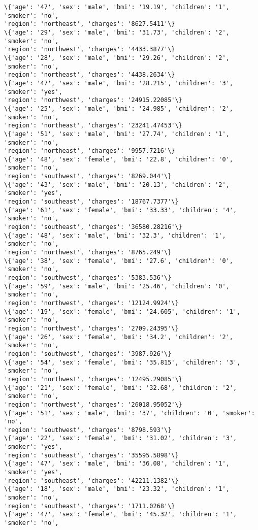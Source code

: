 \documentclass[11pt]{article}
\begin{document}
\begin{Verbatim}[commandchars=\\\{\}]
\{'age': '47', 'sex': 'male', 'bmi': '19.19', 'children': '1', 'smoker': 'no',
'region': 'northeast', 'charges': '8627.5411'\}
\{'age': '29', 'sex': 'male', 'bmi': '31.73', 'children': '2', 'smoker': 'no',
'region': 'northwest', 'charges': '4433.3877'\}
\{'age': '28', 'sex': 'male', 'bmi': '29.26', 'children': '2', 'smoker': 'no',
'region': 'northeast', 'charges': '4438.2634'\}
\{'age': '47', 'sex': 'male', 'bmi': '28.215', 'children': '3', 'smoker': 'yes',
'region': 'northwest', 'charges': '24915.22085'\}
\{'age': '25', 'sex': 'male', 'bmi': '24.985', 'children': '2', 'smoker': 'no',
'region': 'northeast', 'charges': '23241.47453'\}
\{'age': '51', 'sex': 'male', 'bmi': '27.74', 'children': '1', 'smoker': 'no',
'region': 'northeast', 'charges': '9957.7216'\}
\{'age': '48', 'sex': 'female', 'bmi': '22.8', 'children': '0', 'smoker': 'no',
'region': 'southwest', 'charges': '8269.044'\}
\{'age': '43', 'sex': 'male', 'bmi': '20.13', 'children': '2', 'smoker': 'yes',
'region': 'southeast', 'charges': '18767.7377'\}
\{'age': '61', 'sex': 'female', 'bmi': '33.33', 'children': '4', 'smoker': 'no',
'region': 'southeast', 'charges': '36580.28216'\}
\{'age': '48', 'sex': 'male', 'bmi': '32.3', 'children': '1', 'smoker': 'no',
'region': 'northwest', 'charges': '8765.249'\}
\{'age': '38', 'sex': 'female', 'bmi': '27.6', 'children': '0', 'smoker': 'no',
'region': 'southwest', 'charges': '5383.536'\}
\{'age': '59', 'sex': 'male', 'bmi': '25.46', 'children': '0', 'smoker': 'no',
'region': 'northwest', 'charges': '12124.9924'\}
\{'age': '19', 'sex': 'female', 'bmi': '24.605', 'children': '1', 'smoker': 'no',
'region': 'northwest', 'charges': '2709.24395'\}
\{'age': '26', 'sex': 'female', 'bmi': '34.2', 'children': '2', 'smoker': 'no',
'region': 'southwest', 'charges': '3987.926'\}
\{'age': '54', 'sex': 'female', 'bmi': '35.815', 'children': '3', 'smoker': 'no',
'region': 'northwest', 'charges': '12495.29085'\}
\{'age': '21', 'sex': 'female', 'bmi': '32.68', 'children': '2', 'smoker': 'no',
'region': 'northwest', 'charges': '26018.95052'\}
\{'age': '51', 'sex': 'male', 'bmi': '37', 'children': '0', 'smoker': 'no',
'region': 'southwest', 'charges': '8798.593'\}
\{'age': '22', 'sex': 'female', 'bmi': '31.02', 'children': '3', 'smoker': 'yes',
'region': 'southeast', 'charges': '35595.5898'\}
\{'age': '47', 'sex': 'male', 'bmi': '36.08', 'children': '1', 'smoker': 'yes',
'region': 'southeast', 'charges': '42211.1382'\}
\{'age': '18', 'sex': 'male', 'bmi': '23.32', 'children': '1', 'smoker': 'no',
'region': 'southeast', 'charges': '1711.0268'\}
\{'age': '47', 'sex': 'female', 'bmi': '45.32', 'children': '1', 'smoker': 'no',

\end{Verbatim}
\end{document}
